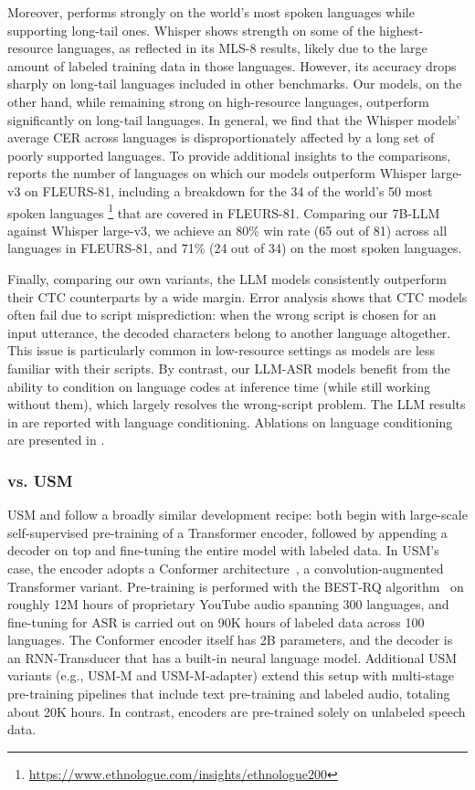 \documentclass[]{fairmeta}
\begin{document}
Moreover, \OmniASR performs strongly on the world’s most spoken languages while supporting long-tail ones. Whisper shows strength on some of the highest-resource languages, as reflected in its MLS-8 results, likely due to the large amount of labeled training data in those languages. However, its accuracy drops sharply on long-tail languages included in other benchmarks. Our models, on the other hand, while remaining strong on high-resource languages, outperform significantly on long-tail languages. In general, we find that the Whisper models' average CER across languages is disproportionately affected by a long set of poorly supported languages. To provide additional insights to the comparisons,  reports the number of languages on which our models outperform Whisper large-v3 on FLEURS-81, including a breakdown for the 34 of the world’s 50 most spoken languages%
\footnote{\url{https://www.ethnologue.com/insights/ethnologue200}}
that are covered in FLEURS-81.  Comparing our 7B-LLM against Whisper large-v3, we achieve an 80\% win rate (65 out of 81) across all languages in FLEURS-81, and 71\% (24 out of 34) on the most spoken languages.

Finally, comparing our own variants, the LLM models consistently outperform their CTC counterparts by a wide margin. Error analysis shows that CTC models often fail due to script misprediction: when the wrong script is chosen for an input utterance, the decoded characters belong to another language altogether. This issue is particularly common in low-resource settings as models are less familiar with their scripts. By contrast, our LLM-ASR models benefit from the ability to condition on language codes at inference time (while still working without them), which largely resolves the wrong-script problem. The LLM results in  are reported with language conditioning. Ablations on language conditioning are presented in .

\subsubsection{\OmniASR vs. USM}
USM and \OmniASR follow a broadly similar development recipe: both begin with large-scale self-supervised pre-training of a Transformer encoder, followed by appending a decoder on top and fine-tuning the entire model with labeled data. In USM’s case, the encoder adopts a Conformer architecture~\citep{gulati2020conformer}, a convolution-augmented Transformer variant. Pre-training is performed with the BEST-RQ algorithm~\citep{chiu2022self} on roughly 12M hours of proprietary YouTube audio spanning 300 languages, and fine-tuning for ASR is carried out on 90K hours of labeled data across 100 languages. The Conformer encoder itself has 2B parameters, and the decoder is an RNN-Transducer that has a built-in neural language model. Additional USM variants (e.g., USM-M and USM-M-adapter) extend this setup with multi-stage pre-training pipelines that include text pre-training and labeled audio, totaling about 20K hours. In contrast, \OmniASR encoders are pre-trained solely on unlabeled speech data.
\end{document}

